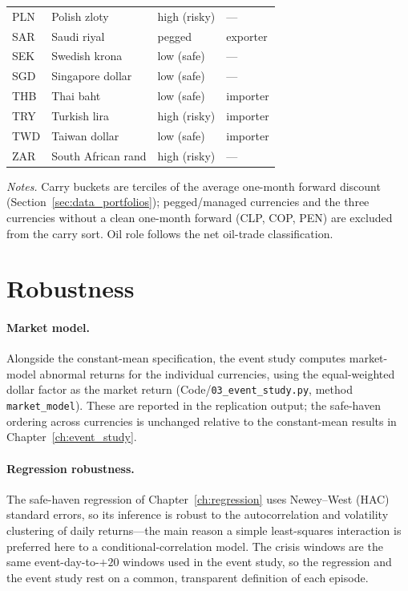 \begin{table}[htbp]
\begin{threeparttable}
\begin{tabular}{ll l l}
PLN & Polish zloty        & high (risky)      & --- \\
SAR & Saudi riyal         & pegged            & exporter \\
SEK & Swedish krona       & low (safe)        & --- \\
SGD & Singapore dollar    & low (safe)        & --- \\
THB & Thai baht           & low (safe)        & importer \\
TRY & Turkish lira        & high (risky)      & importer \\
TWD & Taiwan dollar       & low (safe)        & importer \\
ZAR & South African rand  & high (risky)      & --- \\
\bottomrule
\end{tabular}
\begin{tablenotes}[flushleft]\footnotesize
\item \textit{Notes.} Carry buckets are terciles of the average one-month forward discount
(Section~\ref{sec:data_portfolios}); pegged/managed currencies and the three currencies
without a clean one-month forward (CLP, COP, PEN) are excluded from the carry sort. Oil role
follows the net oil-trade classification.
\end{tablenotes}
\end{threeparttable}
\end{table}

\section{Robustness}
\label{sec:app_robustness}

\paragraph{Market model.} Alongside the constant-mean specification, the event study computes
market-model abnormal returns for the individual currencies, using the equal-weighted dollar
factor as the market return (Code/\texttt{03\_event\_study.py}, method \texttt{market\_model}).
These are reported in the replication output; the safe-haven ordering across currencies is
unchanged relative to the constant-mean results in Chapter~\ref{ch:event_study}.

\paragraph{Regression robustness.} The safe-haven regression of
Chapter~\ref{ch:regression} uses Newey--West (HAC) standard errors, so its inference is
robust to the autocorrelation and volatility clustering of daily returns---the main reason a
simple least-squares interaction is preferred here to a conditional-correlation model. The
crisis windows are the same event-day-to-$+20$ windows used in the event study, so the
regression and the event study rest on a common, transparent definition of each episode.
